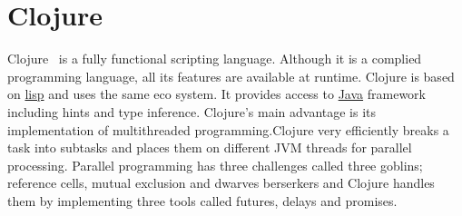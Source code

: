 \section{Clojure}

Clojure~\cite{hid-sp18-413-clojure} is a fully functional scripting
language. Although it is a complied programming language, all its features are
available at runtime. Clojure is based on
\href{https://en.wikipedia.org/wiki/Lisp_(programming_language)}{lisp} and uses
the same eco system. It provides access to
\href{https://en.wikipedia.org/wiki/Java_(programming_language)}{Java} framework
including hints and type inference. Clojure’s main advantage is its
implementation of multithreaded programming.Clojure very efficiently breaks a
task into subtasks and places them on different JVM threads for parallel
processing. Parallel programming has three challenges called three goblins;
reference cells, mutual exclusion and dwarves berserkers and Clojure handles
them by implementing three tools called futures, delays and promises.
